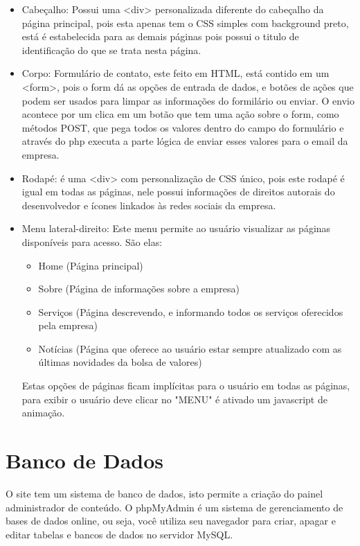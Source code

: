 \documentclass[
	12pt,				%
    oneside,			%
	a4paper,			%
	english,			%
	french,				%
	spanish,			%
	brazil,				%
	]{abntex2}
\begin{document}
\begin{itemize}
	\item{Cabeçalho: Possui uma <div> personalizada diferente do cabeçalho da página principal, pois esta apenas tem o CSS simples com background preto, está é estabelecida para as demais páginas pois possui o titulo de identificação do que se trata nesta página.}
	\item{Corpo: Formulário de contato, este feito em HTML, está contido em um <form>, pois o form dá as opções de entrada de dados, e botões de ações que podem ser usados para limpar as informações do formilário ou enviar. O envio acontece por um clica em um botão que tem uma ação sobre o form, como métodos POST, que pega todos os valores dentro do campo do formulário e através do php executa a parte lógica de enviar esses valores para o email da empresa.}
	\item{Rodapé: é uma <div> com personalização de CSS único, pois este rodapé é igual em todas as páginas, nele possui informações de direitos autorais do desenvolvedor e ícones linkados às redes sociais da empresa.}
	
	\item{Menu lateral-direito: Este menu permite ao usuário visualizar as páginas disponíveis para acesso. São elas: 
	
	\begin{itemize}
			
	\item{Home (Página principal)}
	\item{Sobre (Página de informações sobre a empresa)}
	\item{Serviços (Página descrevendo, e informando todos os serviços oferecidos pela empresa)} 		    \item{Notícias (Página que oferece ao usuário estar sempre atualizado com as últimas novidades da bolsa de valores)}
	
	\end{itemize}
	
	Estas opções de páginas ficam implícitas para o usuário em todas as páginas, para exibir o usuário deve clicar no "MENU" é ativado um javascript de animação.
}
\end{itemize}

\chapter{Banco de Dados}

O site tem um sistema de banco de dados, isto permite a criação do painel administrador de conteúdo. O phpMyAdmin é um sistema de gerenciamento de bases de dados online, ou seja, você utiliza seu navegador para criar, apagar e editar tabelas e bancos de dados no servidor MySQL. 
\end{document}
